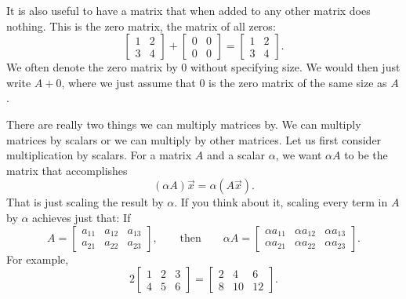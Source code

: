 It is also useful to have a matrix that when added to any other matrix
does nothing.  This is the zero matrix, the matrix of all zeros:
\begin{equation*}
\begin{bmatrix}
1 & 2 \\
3 & 4
\end{bmatrix}
+
\begin{bmatrix}
0 & 0 \\
0 & 0
\end{bmatrix}
=
\begin{bmatrix}
1 & 2 \\
3 & 4
\end{bmatrix} .
\end{equation*}
We often denote the zero matrix
by $0$ without specifying size.  We would then just write $A + 0$, where we
just assume that $0$ is the zero matrix of the same size as $A$.

\medskip

There are really two things we can multiply matrices by.  We can multiply
matrices by scalars or we can multiply by other matrices.  Let us first
consider multiplication by scalars.
For a matrix $A$ and a scalar $\alpha$, we want $\alpha A$ to be the matrix
that accomplishes
\begin{equation*}
(\alpha A) \vec{x} = \alpha (A \vec{x}) .
\end{equation*}
That is just scaling the result by $\alpha$.  If you think about it,
scaling every term in $A$ by $\alpha$ achieves just that:
If
\begin{equation*}
A = 
\begin{bmatrix}
a_{11} & a_{12} & a_{13}  \\
a_{21} & a_{22} & a_{23}
\end{bmatrix},
\qquad\text{then} \qquad
\alpha A = 
\begin{bmatrix}
\alpha a_{11} & \alpha a_{12} & \alpha a_{13}  \\
\alpha a_{21} & \alpha a_{22} & \alpha a_{23}
\end{bmatrix} .
\end{equation*}
For example,
\begin{equation*}
2
\begin{bmatrix}
1 & 2 & 3 \\
4 & 5 & 6
\end{bmatrix} =
\begin{bmatrix}
2 & 4 & 6 \\
8 & 10 & 12
\end{bmatrix} .
\end{equation*}

